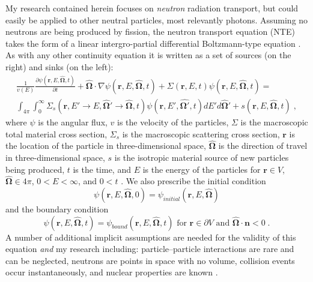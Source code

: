 My research contained herein focuses on \textit{neutron} radiation transport, but could easily be applied to other neutral particles, most relevantly photons.
Assuming no neutrons are being produced by fission, the neutron transport equation (NTE) takes the form of a linear intergro-partial differential Boltzmann-type equation \cite{duderstadt_hamilton}.
As with any other continuity equation it is written as a set of sources (on the right) and sinks (on the left):
\begin{multline}
    \label{eq:fullNTE}
    \frac{1}{v(E)}\frac{\partial \psi(\boldsymbol{r}, E, \boldsymbol{\hat{\Omega}},t)}{\partial t} + \boldsymbol{\hat{\Omega}} \cdot \nabla \psi(\boldsymbol{r}, E, \boldsymbol{\hat{\Omega}},t) + \Sigma(\bm{r}, E, t) \psi(\boldsymbol{r}, E, \boldsymbol{\hat{\Omega}},t) = \\
    \int_{4\pi}\int_{0}^{\infty}\Sigma_s(\boldsymbol{r}, E'\rightarrow E, \boldsymbol{\hat{\Omega}'} \rightarrow \boldsymbol{\hat{\Omega}}, t)
    \psi(\boldsymbol{r}, E', \boldsymbol{\hat{\Omega'}},t) dE' d\boldsymbol{\hat{\Omega}'} +
    s(\boldsymbol{r}, E, \boldsymbol{\hat{\Omega}},t) \;,
\end{multline}
where $\psi$ is the angular flux, $v$ is the velocity of the particles, $\Sigma$ is the macroscopic total material cross section, $\Sigma_s$ is the macroscopic scattering cross section, $\boldsymbol{r}$ is the location of the particle in three-dimensional space, $\boldsymbol{\hat{\Omega}}$ is the direction of travel in three-dimensional space, $s$ is the isotropic material source of new particles being produced, $t$ is the time, and $E$ is the energy of the particles for $\boldsymbol{r} \in V$, $\boldsymbol{\hat{\Omega}} \in 4\pi$, $0<E<\infty$, and $0<t$ \cite{duderstadt_hamilton}. We also prescribe the initial condition
\begin{equation}
    \psi(\boldsymbol{r}, E, \boldsymbol{\hat{\Omega}},0) = \psi_{initial}(\boldsymbol{r}, E, \boldsymbol{\hat{\Omega}})
\end{equation}
and the boundary condition
\begin{equation}
    \psi(\boldsymbol{r}, E, \boldsymbol{\hat{\Omega}},t) = \psi_{bound}(\boldsymbol{r}, E, \boldsymbol{\hat{\Omega}},t) \text{ for } \boldsymbol{r} \in \partial V \text{ and } \boldsymbol{\hat{\Omega}} \cdot \boldsymbol{n} < 0 \;.
\end{equation}
A number of additional implicit assumptions are needed for the validity of this equation \textit{and} my research including: particle--particle interactions are rare and can be neglected, neutrons are points in space with no volume, collision events occur instantaneously, and nuclear properties are known \cite{lewis_computational_1984, duderstadt_hamilton}.

